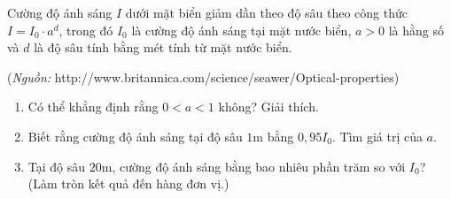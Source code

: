 \begin{bt}%
	Cường độ ánh sáng $I$ dưới mặt biển giảm dần theo độ sâu theo công thức $I=I_0\cdot a^d$, trong đó $I_0$ là cường độ ánh sáng tại mặt nước biển, $a>0$ là hằng số và $d$ là độ sâu tính bằng mét tính từ mặt nước biển.
	\begin{center}
		(\textit{Nguồn:}  http://www.britannica.com/science/seawer/Optical-properties)
	\end{center}
	\begin{enumerate}
		\item Có thể khẳng định rằng $0<a<1$ không? Giải thích.
		\item Biết rằng cường độ ánh sáng tại độ sâu $1$m bằng $0{,}95I_0$. Tìm giá trị của $a$.
		\item Tại độ sâu $20$m, cường độ ánh sáng bằng bao nhiêu phần trăm so với $I_0$? (Làm tròn kết quả đến hàng đơn vị.)
	\end{enumerate}
\end{bt}

